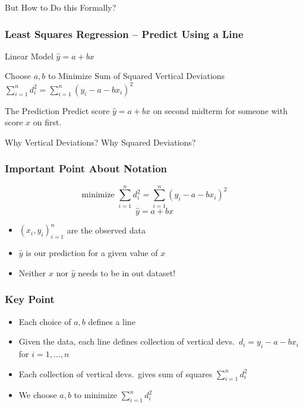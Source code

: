 \documentclass[handout]{beamer}
\begin{document}
\begin{frame}

\centering \Huge But How to Do this Formally?


\end{frame}
\begin{frame}
\frametitle{Least Squares Regression -- Predict Using a Line}
\begin{block}{Linear Model}
$\hat{y} = a + b x$
\end{block}\pause
\begin{block}{Choose $a,b$ to Minimize Sum of Squared Vertical Deviations}
$\displaystyle\sum_{i = 1}^n d_i^2 = \sum_{i=1}^n (y_i - a - b x_i)^2$
\end{block}\pause

\begin{block}{The Prediction}
Predict score $\hat{y} = a + b x$ on second midterm for someone with score $x$ on first.
\end{block}\pause

\begin{block}{Why Vertical Deviations? Why Squared Deviations?}
\end{block}
\end{frame}
\begin{frame}
	\frametitle{Important Point About Notation}
			$$\boxed{\mbox{minimize }\sum_{i = 1}^n d_i^2 = \sum_{i=1}^n (y_i - a - b x_i)^2}$$
			$$\boxed{\hat{y} = a + bx}$$\pause
		\begin{itemize}
		\item $(x_i, y_i)_{i=1}^n$ are the \alert{observed data}\pause
		\item $\widehat{y}$ is our \alert{prediction} for a given value of $x$\pause
		\item Neither $x$ nor $\widehat{y}$ needs to be in out dataset!
	\end{itemize}
\end{frame}
\begin{frame}
\frametitle{Key Point}
	\begin{itemize}
\item Each choice of $a,b$ defines a line \pause
\item Given the data, each line defines collection of vertical devs.\
	$d_i = y_i - a - bx_i$ for $i=1, \hdots, n$ \pause
\item Each collection of vertical devs.\ gives sum of squares $\sum_{i=1}^n d_i^2$ \pause
\item We choose $a,b$ to minimize $\sum_{i=1}^n d_i^2$
\end{itemize}
\end{frame}
\end{document}
